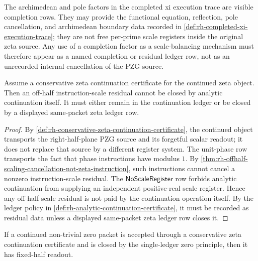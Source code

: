 \begin{principle}
\label{prin:rh-completion-factors-are-ledger-rows}
The archimedean and pole factors in the completed xi execution trace are
visible completion rows.  They may provide the functional equation,
reflection, pole cancellation, and archimedean boundary data recorded in
\autoref{def:rh-completed-xi-execution-trace}; they are not free
per-prime scale registers inside the original zeta source.  Any use of a
completion factor as a scale-balancing mechanism must therefore appear
as a named completion or residual ledger row, not as an unrecorded
internal cancellation of the PZG source.
\end{principle}

\begin{theorem}
\label{thm:rh-conservative-continuation-forbids-scale-register-payment}
Assume a conservative zeta continuation certificate for the continued
zeta object.  Then an off-half instruction-scale residual cannot be
closed by analytic continuation itself.  It must either remain in the
continuation ledger or be closed by a displayed same-packet zeta ledger
row.
\end{theorem}

\begin{proof}
By \autoref{def:rh-conservative-zeta-continuation-certificate}, the
continued object transports the right-half-plane PZG source and its
forgetful scalar readout; it does not replace that source by a different
register system.  The unit-phase row transports the fact that phase
instructions have modulus $1$.  By
\autoref{thm:rh-offhalf-scaling-cancellation-not-zeta-instruction}, such
instructions cannot cancel a nonzero instruction-scale residual.  The
$\mathsf{NoScaleRegister}$ row forbids analytic continuation from
supplying an independent positive-real scale register.  Hence any
off-half scale residual is not paid by the continuation operation itself.
By the ledger policy in
\autoref{def:rh-analytic-continuation-certificate}, it must be recorded
as residual data unless a displayed same-packet zeta ledger row closes it.
\end{proof}

\begin{corollary}
\label{cor:rh-conservative-single-ledger-continuation-fixed-half}
If a continued non-trivial zero packet is accepted through a conservative
zeta continuation certificate and is closed by the single-ledger zero
principle, then it has fixed-half readout.
\end{corollary}

